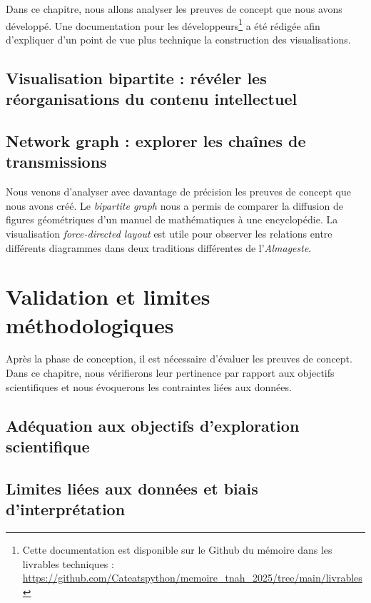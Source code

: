 \documentclass[a4paper,12pt,twoside]{book}
\newcommand{\clearemptydoublepage}{\newpage{\pagestyle{empty}\cleardoublepage}}
\newcommand{\almageste}{\textit{Almageste}\xspace}
\begin{document}
	Dans ce chapitre, nous allons analyser les preuves de concept que nous avons développé. Une documentation pour les développeurs\footnote{Cette documentation est disponible sur le Github du mémoire dans les livrables techniques : \url{https://github.com/Cateatspython/memoire_tnah_2025/tree/main/livrables}} a été rédigée afin d'expliquer d'un point de vue plus technique la construction des visualisations.
	
	\section{Visualisation bipartite : révéler les réorganisations du contenu intellectuel}
	
	
	\section{Network graph : explorer les chaînes de transmissions}
	
	
	Nous venons d'analyser avec davantage de précision les preuves de concept que nous avons créé. Le \textit{bipartite graph} nous a permis de comparer la diffusion de figures géométriques d'un manuel de mathématiques à une encyclopédie. La visualisation \textit{force-directed layout} est utile pour observer les relations entre différents diagrammes dans deux traditions différentes de l'\almageste. 
	
	\clearemptydoublepage
	
	
	\chapter{Validation et limites méthodologiques}
	
	Après la phase de conception, il est nécessaire d'évaluer les preuves de concept. Dans ce chapitre, nous vérifierons leur pertinence par rapport aux objectifs scientifiques et nous évoquerons les contraintes liées aux données.
	
	\section{Adéquation aux objectifs d'exploration scientifique}
	
	
	\section{Limites liées aux données et biais d'interprétation}
	
	
\end{document}
